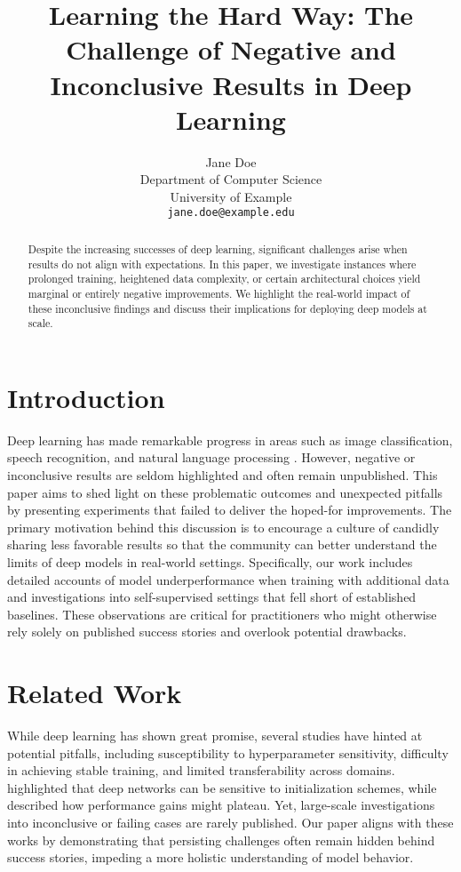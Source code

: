\documentclass{article}
\title{Learning the Hard Way: The Challenge of Negative and Inconclusive Results in Deep Learning}
\author{
  Jane Doe \\
  Department of Computer Science \\
  University of Example\\
  \texttt{jane.doe@example.edu} \\
}
\begin{document}
\maketitle

\begin{abstract}
Despite the increasing successes of deep learning, significant challenges arise when results do not align with expectations. In this paper, we investigate instances where prolonged training, heightened data complexity, or certain architectural choices yield marginal or entirely negative improvements. We highlight the real-world impact of these inconclusive findings and discuss their implications for deploying deep models at scale. 
\end{abstract}

\section{Introduction}
Deep learning has made remarkable progress in areas such as image classification, speech recognition, and natural language processing \citep{Krizhevsky2009, Hinton2012, LeCun2015}. However, negative or inconclusive results are seldom highlighted and often remain unpublished. This paper aims to shed light on these problematic outcomes and unexpected pitfalls by presenting experiments that failed to deliver the hoped-for improvements. The primary motivation behind this discussion is to encourage a culture of candidly sharing less favorable results so that the community can better understand the limits of deep models in real-world settings. Specifically, our work includes detailed accounts of model underperformance when training with additional data and investigations into self-supervised settings that fell short of established baselines. These observations are critical for practitioners who might otherwise rely solely on published success stories and overlook potential drawbacks.

\section{Related Work}
While deep learning has shown great promise, several studies have hinted at potential pitfalls, including susceptibility to hyperparameter sensitivity, difficulty in achieving stable training, and limited transferability across domains. \citet{Hinton2012} highlighted that deep networks can be sensitive to initialization schemes, while \citet{LeCun2015} described how performance gains might plateau. Yet, large-scale investigations into inconclusive or failing cases are rarely published. Our paper aligns with these works by demonstrating that persisting challenges often remain hidden behind success stories, impeding a more holistic understanding of model behavior.
\end{document}
